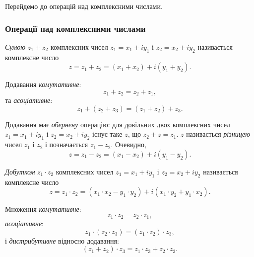 Перейдемо до операцій над комплексними числами.

\subsubsection{Операції над комплексними числами}

\textit{Сумою} $z_1 + z_2$ комплексних чисел $z_1 = x_1 + i y_1$ і $z_2 = x_2 + i y_2$ називається комплексне число
\begin{equation}
	\label{eq:1.1.4}
	z = z_1 + z_2 = (x_1 + x_2) + i (y_1 + y_2).
\end{equation}

Додавання \textit{комутативне}:
\begin{equation}
	\label{eq:1.1.5}
	z_1 + z_2 = z_2 + z_1,
\end{equation}
та \textit{асоціативне}:
\begin{equation}
	\label{eq:1.1.6}
	z_1 + (z_2 + z_3) = (z_1 + z_2) + z_3.
\end{equation}

Додавання має \textit{обернену} операцію: для довільних двох комплексних чисел $z_1 = x_1 + i y_1$ і $z_2 = x_2 + i y_2$ існує таке $z$, що $z_2 + z = z_1$. $z$ називається \textit{різницею} чисел $z_1$ і $z_2$ і позначається $z_1 - z_2$. Очевидно,
\begin{equation}
	\label{eq:1.1.7}
	z = z_1 - z_2 = (x_1 - x_2) + i (y_1 - y_2).
\end{equation}

\textit{Добутком} $z_1 \cdot z_2$ комплексних чисел $z_1 = x_1 + i y_1$ і $z_2 = x_2 + i y_2$ називається комплексне число
\begin{equation}
	\label{eq:1.1.8}
	z = z_1 \cdot z_2 = (x_1 \cdot x_2 - y_1 \cdot y_2) + i (x_1 \cdot y_2 + y_1 \cdot x_2).
\end{equation}

Множення \textit{комутативне}:
\begin{equation}
	\label{eq:1.1.9}
	z_1 \cdot z_2 = z_2 \cdot z_1,
\end{equation}
\textit{асоціативне}:
\begin{equation}
	\label{eq:1.1.10}
	z_1 \cdot (z_2 \cdot z_3) = (z_1 \cdot z_2) \cdot z_3,
\end{equation}
і \textit{дистрибутивне} відносно додавання:
\begin{equation}
	\label{eq:1.1.11}
	(z_1 + z_2) \cdot z_3 = z_1 \cdot z_3 + z_2 \cdot z_3.
\end{equation}


